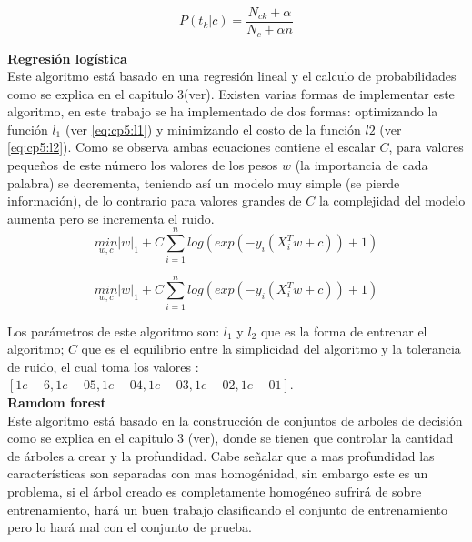 \begin{equation}
P(t_k|c)=\frac{N_{ck}+\alpha}{N_c+\alpha n}
\label{eq:cp5:naiveBayes}
\end{equation}

\textbf{Regresión logística}\\

 Este algoritmo está basado en una regresión lineal y el calculo de probabilidades como se explica en el capitulo 3(ver). Existen varias formas de implementar este algoritmo, en este trabajo se ha implementado de dos formas: optimizando la función $l_1$ (ver \ref{eq:cp5:l1}) y minimizando el costo de la función $l2$ (ver \ref{eq:cp5:l2}). Como se observa ambas ecuaciones contiene el escalar $C$, para valores pequeños de este número los valores de los pesos $w$ (la importancia de cada palabra) se decrementa, teniendo así un modelo muy simple (se pierde información), de lo contrario para valores grandes de $C$ la complejidad del modelo aumenta pero se incrementa el ruido.\\

\begin{equation}
\underset{w,c}{min}{\left|w\right|}_1+C\sum_{i=1}^{n}log(exp(-y_i(X_{i}^{T} w+c ))+1)
\label{eq:cp5:l1}
\end{equation}


\begin{equation}
\underset{w,c}{min}{\left|w\right|}_1+C\sum_{i=1}^{n}log(exp(-y_i(X_{i}^{T} w+c ))+1)
\label{eq:cp5:l2}
\end{equation}


Los parámetros de este algoritmo son: $l_1$ y $l_2$ que es la forma de entrenar el algoritmo; $C$ que es el equilibrio entre la simplicidad del algoritmo y la tolerancia de ruido, el cual toma los valores :$[1e-6, 1e-05, 1e-04, 1e-03, 1e-02, 1e-01]$.\\


\textbf{Ramdom forest}\\

Este algoritmo está basado en la construcción de conjuntos de arboles de decisión como se explica en el capitulo 3 (ver), donde se tienen que controlar la cantidad de árboles a crear y la profundidad. Cabe señalar que a mas profundidad las características son separadas con mas homogénidad, sin embargo este es un problema, si el árbol creado es completamente homogéneo sufrirá de sobre entrenamiento, hará un buen trabajo clasificando el conjunto de entrenamiento pero lo hará mal con el conjunto de prueba.\\

